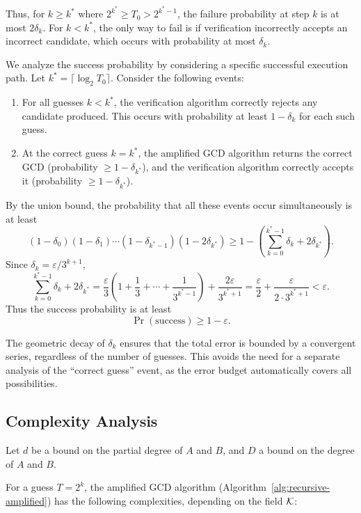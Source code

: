 \documentclass{article}
\numberwithin{equation}{section}
\begin{document}
Thus, for $k \ge k^*$ where $2^{k^*} \ge T_0>2^{k^*-1}$, the failure probability at step $k$ is at most $2\delta_k$. For $k < k^*$, the only way to fail is if verification incorrectly accepts an incorrect candidate, which occurs with probability at most $\delta_k$.

We analyze the success probability by considering a specific successful execution path. Let $k^* = \lceil \log_2 T_0 \rceil$. Consider the following events:

\begin{enumerate}
    \item For all guesses $k < k^*$, the verification algorithm correctly rejects any candidate produced. This occurs with probability at least $1-\delta_k$ for each such guess.
    \item At the correct guess $k = k^*$, the amplified GCD algorithm returns the correct GCD (probability $\ge 1-\delta_{k^*}$), and the verification algorithm correctly accepts it (probability $\ge 1-\delta_{k^*}$).
\end{enumerate}

By the union bound, the probability that all these events occur simultaneously is at least
\[
(1-\delta_0)(1-\delta_1)\cdots(1-\delta_{k^*-1})(1-2\delta_{k^*})
\ge 1 - \left(\sum_{k=0}^{k^*-1} \delta_k + 2\delta_{k^*}\right).
\]
Since $\delta_k = \varepsilon / 3^{k+1}$,
\[
\sum_{k=0}^{k^*-1} \delta_k + 2\delta_{k^*}
= \frac{\varepsilon}{3}\left(1 + \frac{1}{3} + \cdots + \frac{1}{3^{k^*-1}}\right) + \frac{2\varepsilon}{3^{k^*+1}}
= \frac{\varepsilon}{2} + \frac{\varepsilon}{2 \cdot 3^{k^*+1}}
< \varepsilon.
\]
Thus the success probability is at least
\[
\Pr(\text{success}) \ge 1 - \varepsilon.
\]

\begin{remark}
The geometric decay of $\delta_k$ ensures that the total error is bounded by a convergent series, regardless of the number of guesses. This avoids the need for a separate analysis of the ``correct guess'' event, as the error budget automatically covers all possibilities.
\end{remark}

\subsection*{Complexity Analysis}

Let $d$ be a bound on the partial degree of $A$ and $B$, and $D$ a bound on the degree of $A$ and $B$.


For a guess $T = 2^k$, the amplified GCD algorithm (Algorithm~\ref{alg:recursive-amplified}) has the following complexities, depending on the field ${\mathcal{K}}$:
\end{document}
